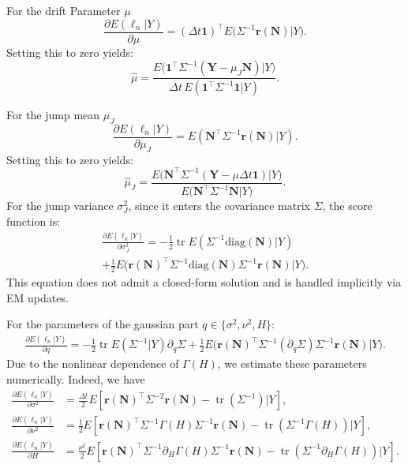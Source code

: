\documentclass[a4paper,11pt]{amsart}
\theoremstyle{definition}
\theoremstyle{plain}
\theoremstyle{remark}
\newcommand{\1}{\mathbf{1}}
\begin{document}
For the drift Parameter $\mu$
\begin{equation*}
	\frac{\partial E(\ell_n|Y)}{\partial \mu}
	=
	(\Delta t \mathbf{1})^\top E\bigl(\Sigma^{-1} \mathbf{r(N)}
    |Y).
\end{equation*}
Setting this to zero yields:
\begin{equation*}
	\hat{\mu} =
	\frac{E\bigl(\mathbf{1}^\top \Sigma^{-1} (\mathbf{Y} -\mu_J\mathbf{N}) \big\vert Y\bigr)}
	{\Delta t\, E(\mathbf{1}^\top \Sigma^{-1} \mathbf{1}| Y)}.
\end{equation*}

For the jump mean $\mu_J$
\begin{equation*}
	\frac{\partial E(\ell_n|Y)}{\partial \mu_J}
	=
	 E(\mathbf{N}^\top \Sigma^{-1} \mathbf{r(N)}|Y).
\end{equation*}
Setting this to zero yields:
\begin{equation*}
	\hat{\mu}_J
	=
	\frac{E\bigl( \mathbf{N}^\top \Sigma^{-1} (\mathbf{Y} -\mu\Delta t\mathbf{1})
    \big\vert Y\bigr)
    }
	{E\bigl(\mathbf{N}^\top \Sigma^{-1} \mathbf{N}
    \vert Y)}.
\end{equation*}
For the jump variance $\sigma_J^2$, 
since it enters the covariance matrix $\Sigma$, the score function is:
\begin{align*}
	\frac{\partial E(\ell_n|Y)}{\partial \sigma_J^2}
	=
	-\frac{1}{2}\operatorname{tr}E\left(\Sigma^{-1} \mathrm{diag}(\mathbf{N}) \vert Y\right)\\
	+
\frac{1}{2} E\bigl(\mathbf{r(N)}^\top\Sigma^{-1}
\mathrm{diag}(\mathbf{N})\Sigma^{-1}\mathbf{r(N)}
\big\vert Y\bigr).
\end{align*}
This equation does not admit a closed-form solution and is handled implicitly via EM updates.

For the parameters of the gaussian part  $q \in \{\sigma^2, \nu^2, H\}$:
\begin{align*}
		\frac{\partial E(\ell_n| Y)}{\partial q}
		=
		-\frac{1}{2} \operatorname{tr}E(\Sigma^{-1}\vert  Y
        ) \partial_q \Sigma
        +
		\frac{1}{2}E \bigl( 
	\mathbf{r(N)}^\top
		\Sigma^{-1}
		(\partial_q \Sigma)
		\Sigma^{-1}
		\mathbf{r(N)}
        \big\vert Y\bigr).
\end{align*}
Due to the nonlinear dependence of $\Gamma(H)$, we estimate these parameters numerically.
Indeed, we have
	\begin{align*}
		\frac{\partial E(\ell_n| Y)}{\partial \sigma^2}
		&=
		\frac{\Delta t}{2}E\left[\mathbf{r(N)}^\top
		\Sigma^{-2}
		\mathbf{r(N)} - \operatorname{tr}(\Sigma^{-1})
        \big\vert Y
        \right],\\
		\frac{\partial E(\ell_n|Y)}{\partial \nu^2}
		&=
		\frac{1}{2}E\left[\mathbf{r(N)}^\top
		\Sigma^{-1}\Gamma(H)\Sigma^{-1}
		\mathbf{r(N)} - \operatorname{tr}\left(\Sigma^{-1}\Gamma(H)\right)
        \big\vert Y
        \right],\\
		\frac{\partial E(\ell_n|Y)}{\partial H}
		&=
		\frac{\nu^2}{2}E\left[\mathbf{r(N)}^\top
		\Sigma^{-1}\partial_H\Gamma(H)\Sigma^{-1}
		\mathbf{r(N)} - \operatorname{tr}\left(\Sigma^{-1}\partial_H\Gamma(H)\right)\big\vert Y\right].
	\end{align*}
\end{document}
